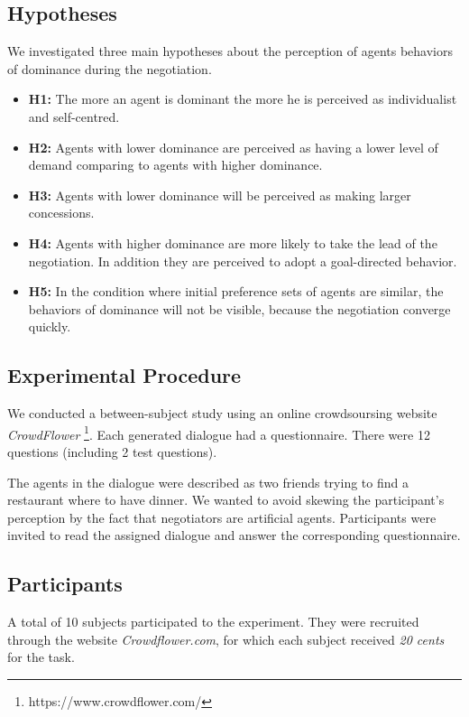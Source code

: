 \documentclass{llncs}
\begin{document}
	\subsection{Hypotheses}
	 We investigated three main hypotheses about the perception of agents behaviors of dominance during the negotiation. 
	 \begin{itemize}
	 	\item  \textbf{H1:} The more an agent is dominant the more he is perceived as individualist and self-centred.  
	 	
	 	\item \textbf{H2:} Agents with lower dominance are perceived as having a lower level of demand comparing to agents with higher dominance. 
	 	
	 	\item \textbf{H3:} Agents with lower dominance will be perceived as making larger concessions.
	 	
	 	\item \textbf{H4:} Agents with higher dominance are more likely to take the lead of the negotiation. In addition they are perceived to adopt a goal-directed behavior. 
	 	
	 	\item \textbf{H5:} In the condition where initial preference sets of agents are similar, the behaviors of dominance will not be visible, because the negotiation converge quickly.
	 	
	 \end{itemize}
			
	\subsection{Experimental Procedure}
	
	We conducted a between-subject study using an online crowdsoursing website \emph{CrowdFlower} \footnote{https://www.crowdflower.com/}. 
	Each generated dialogue had a questionnaire. There were 12 questions (including 2 test questions).
	
	The agents in the dialogue were described as two friends trying to find a restaurant where to have dinner. We wanted to avoid skewing the participant's perception by the fact that negotiators are artificial agents. Participants were invited to read the assigned dialogue and answer the corresponding questionnaire. 
	
	\subsection{Participants}
	A total of 10 subjects participated to the experiment. They were recruited through the website \emph{Crowdflower.com}, for which each subject received \textit{20 cents} for the task. 
	
\end{document}

